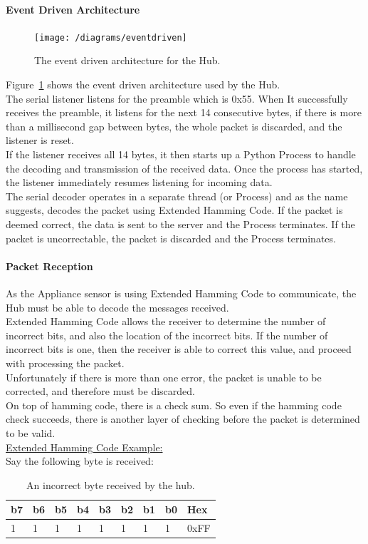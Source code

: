 \documentclass[preprint,12pt,3p]{elsarticle}
\begin{document}
\paragraph{Event Driven Architecture}

\begin{figure}[H]
    \centering
    \texttt{[image: /diagrams/eventdriven]}
    \caption{The event driven architecture for the Hub.}
    \label{fig:eventdriven}
\end{figure}

Figure~\ref{fig:eventdriven} shows the event driven architecture used by the Hub.\\
The serial listener listens for the preamble which is 0x55. When It successfully receives the preamble, it listens for the next 14 consecutive bytes, if there is more than a millisecond gap between bytes, the whole packet is discarded, and the listener is reset.\\
If the listener receives all 14 bytes, it then starts up a Python Process to handle the decoding and transmission of the received data. Once the process has started, the listener immediately resumes listening for incoming data.\\ 
The serial decoder operates in a separate thread (or Process) and as the name suggests, decodes the packet using Extended Hamming Code. If the packet is deemed correct, the data is sent to the server and the Process terminates. If the packet is uncorrectable, the packet is discarded and the Process terminates.

\paragraph{Packet Reception}
As the Appliance sensor is using Extended Hamming Code to communicate, the Hub must be able to decode the messages received.\\
Extended Hamming Code allows the receiver to determine the number of incorrect bits, and also the location of the incorrect bits. If the number of incorrect bits is one, then the receiver is able to correct this value, and proceed with processing the packet.\\
Unfortunately if there is more than one error, the packet is unable to be corrected, and therefore must be discarded.\\
On top of hamming code, there is a check sum. So even if the hamming code check succeeds, there is another layer of checking before the packet is determined to be valid.\\[5pt]
\underline{Extended Hamming Code Example:}\\[5pt]
Say the following byte is received:
\begin{table}[H]
\centering
\begin{tabular}{| l | l | l | l | l | l | l | l | l |}
\hline
b7 & b6 & b5 & b4 & b3 & b2 & b1 & b0 & Hex\\ \hline
1 & 1 & 1 & 1 & 1 & 1 & 1 & 1 & 0xFF\\ \hline
\end{tabular}
\caption{An incorrect byte received by the hub.}
\label{tab:incorrectpacket}
\end{table}
\end{document}
